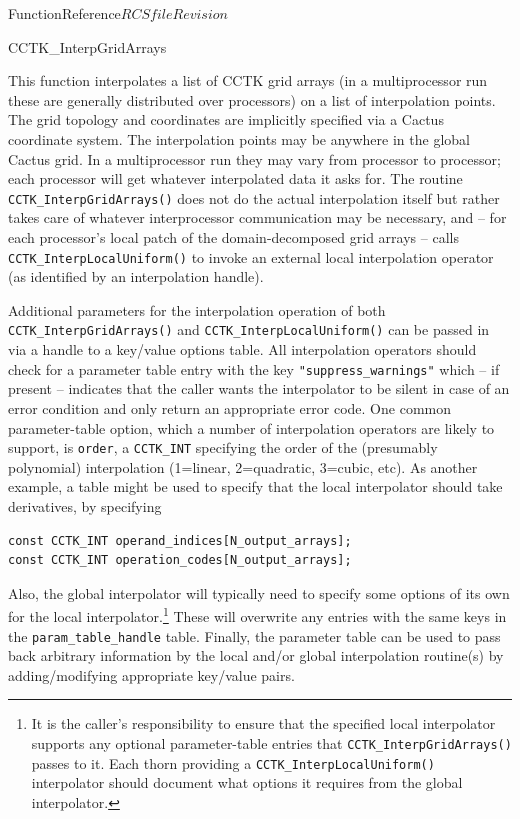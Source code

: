\begin{cactuspart}{FunctionReference}{$RCSfile$}{$Revision$}
\begin{FunctionDescription}{CCTK\_InterpGridArrays}
\begin{Discussion}
This function interpolates a list of CCTK grid arrays (in a multiprocessor run
these are generally distributed over processors) on a list of interpolation
points. The grid topology and coordinates are implicitly specified via a Cactus
coordinate system.
The interpolation points may be anywhere in the global Cactus grid.
In a multiprocessor run they may vary from processor to processor;
each processor will get whatever interpolated data it asks for.
The routine {\tt CCTK\_InterpGridArrays()} does not do the actual interpolation
itself but rather takes care of whatever interprocessor communication may be
necessary, and -- for each processor's local patch of the domain-decomposed grid
arrays -- calls {\tt CCTK\_InterpLocalUniform()} to invoke an external
local interpolation operator (as identified by an interpolation handle).

Additional parameters for the interpolation operation of both
{\tt CCTK\_InterpGridArrays()} and {\tt CCTK\_InterpLocalUniform()} can be
passed in via a handle to a key/value options table.
All interpolation operators should check for a parameter table entry with the
key \verb|"suppress_warnings"| which -- if present -- indicates that the
caller wants the interpolator to be silent in case of an error condition and
only return an appropriate error code.
One common parameter-table option, which a number of interpolation
operators are likely to support, is \verb|order|, a \verb|CCTK_INT|
specifying the order of the (presumably polynomial) interpolation
(1=linear, 2=quadratic, 3=cubic, etc).
As another example, a table might be used to specify that the local interpolator
should take derivatives, by specifying
\begin{verbatim}
const CCTK_INT operand_indices[N_output_arrays];
const CCTK_INT operation_codes[N_output_arrays];
\end{verbatim}
Also, the global interpolator will typically need to specify some options
of its own for the local interpolator.\footnote{
It is the caller's responsibility to ensure that the specified local
interpolator supports any optional parameter-table entries that
{\tt CCTK\_InterpGridArrays()} passes to it. Each thorn providing a
{\tt CCTK\_InterpLocalUniform()} interpolator should document what options it
requires from the global interpolator.
}
These will overwrite any entries
with the same keys in the \verb|param_table_handle| table.
Finally, the parameter table can be used to pass back arbitrary information by the local
and/or global interpolation routine(s) by adding/modifying appropriate
key/value pairs.


\end{Discussion}
\end{FunctionDescription}
\end{cactuspart}
